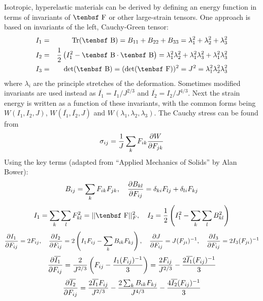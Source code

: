 \documentclass[11pt]{book}
\def\B{\hbox{\tenbsf B}}
\def\F{\hbox{\tenbsf F}}
\begin{document}
Isotropic, hyperelastic materials can be derived by defining an energy function in terms of invariants of $\F$ or other large-strain tensors. One approach is based on invariants of the left, Cauchy-Green tensor:
\begin{eqnarray}
          I_1 & = & {\rm Tr}(\B) = B_{11} + B_{22} + B_{33} = \lambda_1^2 +  \lambda_2^2 + \lambda_3^2 \\
          I_2 & = & {1\over2}\left(I_1^2 - \B\cdot \B\right) = \lambda_1^2\lambda_2^2 + \lambda_1^2\lambda_3^2 + \lambda_1^2\lambda_3^2\\
          I_3 & = & {\rm det}(\B) = ({\rm det}(\F))^2=J^2 = \lambda_1^2\lambda_2^2\lambda_3^2
\end{eqnarray}
where $\lambda_i$ are the principle stretches of the deformation.
Sometimes modified invariants are used instead as $\overline{I_1} = I_1/J^{2/3}$ and $\overline{I_2} = I_2/J^{4/3}$. Next the strain energy is written as a function of these invariants, with the common forms being $W(I_1,I_2,J)$, $W(\overline{I_1},\overline{I_2},J)$ and $W( \lambda_1,\lambda_2,\lambda_3)$. The Cauchy stress can be found from
\begin{equation}
     \sigma_{ij} = {1\over J} \sum_k F_{ik}{\partial W\over \partial F_{jk}}
\end{equation}
Using the key terms (adapted from ``Applied Mechanics of Solids'' by Alan Bower):
\begin{equation}
    B_{ij} = \sum_k F_{ik}F_{jk}, \quad
    {\partial B_{kl}\over\partial F_{ij}} = \delta_{ki}F_{lj} + \delta_{li}F_{kj}
\end{equation}
\begin{equation}
    I_1 = \sum_k\sum_l F_{kl}^2 = || \F ||_F^2 ,\quad
    I_2 = {1\over2}\left(I_1^2 - \sum_k\sum_l B_{kl}^2\right)
\end{equation}
\begin{equation}
    {\partial I_1\over\partial F_{ij}} = 2F_{ij}, \quad
    {\partial I_2\over\partial F_{ij}} = 2\left(I_1F_{ij}-\sum_k B_{ik}F_{kj}\right), \quad
    {\partial J\over \partial F_{ij}} = J (F_{ji})^{-1}, \quad
    {\partial I_3\over\partial F_{ij}} = 2I_3(F_{ji})^{-1}
\end{equation}
\begin{equation}
    {\partial \overline{I_1}\over\partial F_{ij}} = {2\over J^{2/3}}\left(F_{ij} - {I_1 (F_{ij})^{-1}\over 3}\right)
    = {2F_{ij}\over J^{2/3}} - {2\overline{I_1} (F_{ij})^{-1}\over 3}
\end{equation}
\begin{equation}
    {\partial \overline{I_2}\over\partial F_{ij}} =
    {2\overline{I_1} F_{ij}\over J^{2/3}}- {2\sum_k B_{ik}F_{kj}\over J^{4/3}} - {4 \overline{I_2}(F_{ij})^{-1}\over 3}
\end{equation}
\end{document}
